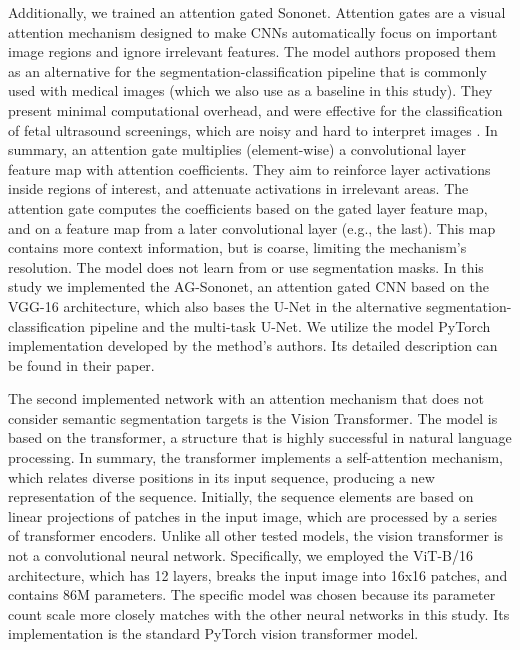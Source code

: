 \documentclass[fleqn,10pt]{wlscirep}
\begin{document}
{Additionally, we trained an attention gated Sononet\cite{AGNet}. Attention gates are a visual attention mechanism designed to make CNNs automatically focus on important image regions and ignore irrelevant features. The model authors proposed them as an alternative for the segmentation-classification pipeline that is commonly used with medical images (which we also use as a baseline in this study). They present minimal computational overhead, and were effective for the classification of fetal ultrasound screenings, which are noisy and hard to interpret images \cite{AGNet}. In summary, an attention gate multiplies (element-wise) a convolutional layer feature map with attention coefficients. They aim to reinforce layer activations inside regions of interest, and attenuate activations in irrelevant areas. The attention gate computes the coefficients based on the gated layer feature map, and on a feature map from a later convolutional layer (e.g., the last). This map  contains more context information, but is coarse, limiting the mechanism's resolution. The model does not learn from or use segmentation masks. In this study we implemented the AG-Sononet, an attention gated CNN based on the VGG-16 architecture, which also bases the U-Net in the alternative segmentation-classification pipeline and the multi-task U-Net. We utilize the model PyTorch implementation developed by the method's authors. Its detailed description can be found in their paper\cite{AGNet}.

The second implemented network with an attention mechanism that does not consider semantic segmentation targets is the Vision Transformer\cite{VisionTransformer}. The model is based on the transformer, a structure that is highly successful in natural language processing. In summary, the transformer implements a self-attention mechanism, which relates diverse positions in its input sequence, producing a new representation of the sequence\cite{transformer}. Initially, the sequence elements are based on linear projections of patches in the input image, which are processed by a series of transformer encoders. Unlike all other tested models, the vision transformer is not a convolutional neural network. Specifically, we employed the ViT-B/16 architecture\cite{VisionTransformer}, which has 12 layers, breaks the input image into 16x16 patches, and contains 86M parameters. The specific model was chosen because its parameter count scale more closely matches with the other neural networks in this study. Its implementation is the standard PyTorch vision transformer model.

}
\end{document}
